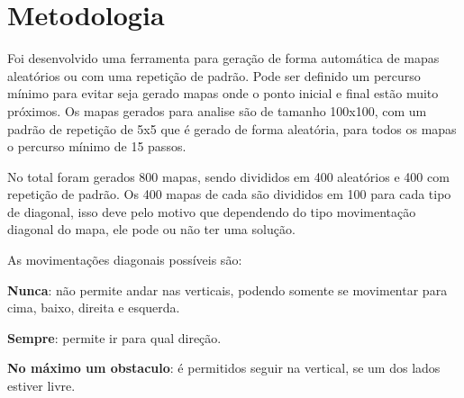 \chapter[Metodologia]{Metodologia}

Foi desenvolvido uma ferramenta para geração de forma automática de mapas aleatórios ou com uma repetição de padrão. Pode ser definido um percurso mínimo para evitar seja gerado mapas onde o ponto inicial e final estão muito próximos.
Os mapas gerados para analise são de tamanho 100x100, com um padrão de repetição de 5x5 que é gerado de forma aleatória, para todos os mapas o percurso mínimo de 15 passos.

No total foram gerados 800 mapas, sendo divididos em 400 aleatórios e 400 com repetição de padrão.
Os 400 mapas de cada são divididos em 100 para cada tipo de diagonal, isso deve pelo motivo que dependendo do tipo movimentação diagonal do mapa, ele pode ou não ter uma solução.

As movimentações diagonais possíveis são:

\textbf{Nunca}: não permite andar nas verticais, podendo somente se movimentar para cima, baixo, direita e esquerda.

\textbf{Sempre}: permite ir para qual direção.

\begin{minipage}{\linewidth}
    \label{fig:d_aways}
\end{minipage}

\textbf{No máximo um obstaculo}: é permitidos seguir na vertical, se um dos lados estiver livre.

\begin{minipage}{\linewidth}
    \label{fig:d_one}
\end{minipage}


